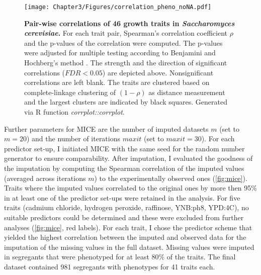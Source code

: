 \begin{figure}[hbtp]
	\centering
	\texttt{[image: Chapter3/Figures/correlation\_pheno\_noNA.pdf]}
	\caption[\textbf{Pairwise correlations of \num{46} growth traits in \emph{Saccharomyces cerevisiae}.}]{\textbf{Pair-wise correlations of \num{46} growth traits in \emph{Saccharomyces cerevisiae}.} For each trait pair, Spearman's correlation coefficient \(\rho\) and the p-values of the correlation were computed. The p-values were adjusted for multiple testing according to Benjamini and Hochberg's method \citep{Benjamini1995}. The strength and the direction of significant correlations (\(FDR < 0.05\)) are depicted above. Nonsignificant correlations are left blank. The traits are clustered based on complete-linkage clustering of \((1-\rho)\) as distance measurement and the largest clusters are indicated by black squares. Generated via R function \textit{corrplot::corrplot}.}
 	\label{fig:traitcorrelations}
\end{figure}


Further parameters for MICE are the number of imputed datasets \(m\) (set to \(m=20\)) and the number of iterations \(maxit\) (set to \(maxit=30\)). For each predictor set-up, I initiated MICE with the same seed for the random number generator to ensure comparability. After imputation, I evaluated the goodness of the imputation  by computing the Spearman correlation of the imputed values (averaged across iterations \(m\)) to the experimentally observed ones (\cref{fig:mice}). Traits where the imputed values correlated to the original ones by more then \num{95}\% in at least one of the predictor set-ups were retained in the analysis. For five traits (cadmium chloride, hydrogen peroxide, raffinose, YNB:ph8, YPD:4C), no suitable predictors could be determined and these were excluded from further analyses (\cref{fig:mice}, red labels). For each trait, I chose the predictor scheme that yielded the highest correlation between the imputed and observed data for the imputation of the missing values in the full dataset. Missing values were imputed in segregants that were phenotyped for at least \num{80}\% of the traits. The final dataset contained \num{981} segregants with phenotypes for \num{41} traits each. 
 	
